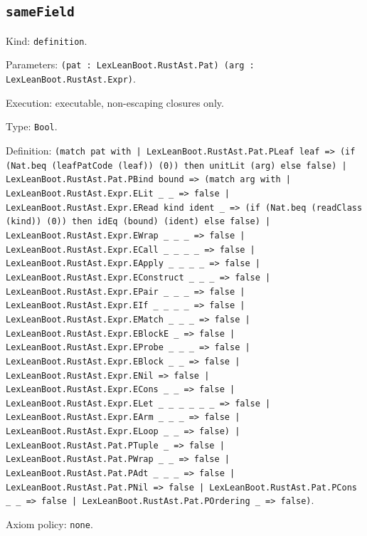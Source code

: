 \documentclass[11pt]{article}
\begin{document}
\subsection*{\texttt{sameField}}
\noindent Kind: \texttt{definition}.\par
\noindent Parameters: \texttt{(pat : LexLeanBoot.RustAst.Pat) (arg : LexLeanBoot.RustAst.Expr)}.\par
\noindent Execution: executable, non-escaping closures only.\par
\noindent Type: \texttt{Bool}.\par
\noindent Definition: \texttt{(match pat with | LexLeanBoot.RustAst.Pat.PLeaf leaf => (if (Nat.beq (leafPatCode (leaf)) (0)) then unitLit (arg) else false) | LexLeanBoot.RustAst.Pat.PBind bound => (match arg with | LexLeanBoot.RustAst.Expr.ELit \_ \_ => false | LexLeanBoot.RustAst.Expr.ERead kind ident \_ => (if (Nat.beq (readClass (kind)) (0)) then idEq (bound) (ident) else false) | LexLeanBoot.RustAst.Expr.EWrap \_ \_ \_ => false | LexLeanBoot.RustAst.Expr.ECall \_ \_ \_ \_ => false | LexLeanBoot.RustAst.Expr.EApply \_ \_ \_ \_ => false | LexLeanBoot.RustAst.Expr.EConstruct \_ \_ \_ => false | LexLeanBoot.RustAst.Expr.EPair \_ \_ \_ => false | LexLeanBoot.RustAst.Expr.EIf \_ \_ \_ \_ => false | LexLeanBoot.RustAst.Expr.EMatch \_ \_ \_ => false | LexLeanBoot.RustAst.Expr.EBlockE \_ => false | LexLeanBoot.RustAst.Expr.EProbe \_ \_ \_ => false | LexLeanBoot.RustAst.Expr.EBlock \_ \_ => false | LexLeanBoot.RustAst.Expr.ENil => false | LexLeanBoot.RustAst.Expr.ECons \_ \_ => false | LexLeanBoot.RustAst.Expr.ELet \_ \_ \_ \_ \_ \_ => false | LexLeanBoot.RustAst.Expr.EArm \_ \_ \_ => false | LexLeanBoot.RustAst.Expr.ELoop \_ \_ => false) | LexLeanBoot.RustAst.Pat.PTuple \_ => false | LexLeanBoot.RustAst.Pat.PWrap \_ \_ => false | LexLeanBoot.RustAst.Pat.PAdt \_ \_ \_ => false | LexLeanBoot.RustAst.Pat.PNil => false | LexLeanBoot.RustAst.Pat.PCons \_ \_ => false | LexLeanBoot.RustAst.Pat.POrdering \_ => false)}.\par
\noindent Axiom policy: \texttt{none}.\par
\end{document}
